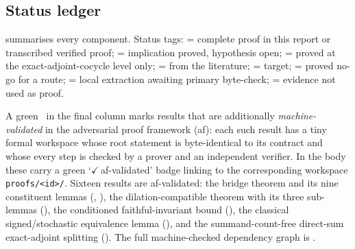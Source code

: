 \subsection{Status ledger}

 summarises every component. Status tags:  =
complete proof in this report or transcribed verified proof;  = implication proved, hypothesis open;  = proved at
the exact-adjoint-cocycle level only;  = from the literature;
 = target;  = proved no-go for a route;
 = local extraction awaiting primary byte-check;
 = evidence not used as proof.

A green \afyes\ in the final column marks results that are additionally
\emph{machine-validated} in the adversarial proof framework (af): each such
result has a tiny formal workspace whose root statement is byte-identical to its
contract and whose every step is checked by a prover and an independent verifier.
In the body these carry a green `\textcolor{afgreen}{$\checkmark$\,af-validated}'
badge linking to the corresponding workspace \texttt{proofs/<id>/}. Sixteen
results are af-validated: the bridge theorem and its nine constituent lemmas
(, ), the dilation-compatible theorem with
its three sub-lemmas (), the conditioned faithful-invariant
bound (), the classical signed/stochastic
equivalence lemma (), and the summand-count-free
direct-sum exact-adjoint splitting (). The full machine-checked
dependency graph is .

